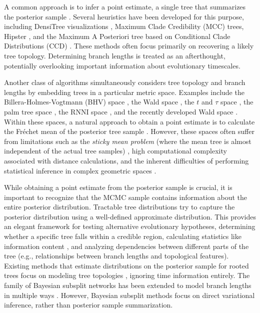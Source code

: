 \documentclass[10pt,letterpaper]{article}
\begin{document}
A common approach is to infer a point estimate, a single  tree that summarizes the posterior sample \cite{treesinforest}. Several heuristics have been developed for this purpose, including DensiTree visualizations \cite{densitree}, Maximum Clade Credibility (MCC) trees, Hipster \cite{hipstr}, and the Maximum A Posteriori tree based on Conditional Clade Distributions (CCD) \cite{ccd,ccdlarget}. These methods often focus primarily on recovering a likely tree topology. Determining branch lengths is treated as an afterthought, potentially overlooking important information about evolutionary timescales.

Another class of algorithms simultaneously considers tree topology and branch lengths by embedding trees in a particular metric space. Examples include the Billera-Holmes-Vogtmann (BHV) space \cite{bhv}, the Wald space \cite{wald}, the $t$ and $\tau$ space \cite{tauspace}, the palm tree space \cite{tropical}, the RNNI space \cite{rnnispace}, and the recently developed Wald space \cite{wald}. Within these spaces, a natural approach to obtain a point estimate is to calculate the Fréchet mean of the posterior tree sample \cite{frechetmeanvar}. However, these spaces often suffer from limitations such as the \emph{sticky mean problem} (where the mean tree is almost independent of the actual tree samples) \cite{sticky}, high computational complexity associated with distance calculations, and the inherent difficulties of performing statistical inference in complex geometric spaces \cite{riemanngaussian}.

While obtaining a point estimate from the posterior sample is crucial, it is important to recognize that the MCMC sample contains information about the entire posterior distribution. Tractable tree distributions \cite{ccd} try to capture the posterior distribution using a well-defined approximate distribution. This provides an elegant framework for testing alternative evolutionary hypotheses, determining whether a specific tree falls within a credible region, calculating statistics like information content \cite{informationcontent}, and analyzing dependencies between different parts of the tree (e.g., relationships between branch lengths and topological features). Existing methods that estimate distributions on the posterior sample for rooted trees focus on modeling tree topologies \cite{ccd,ccdlarget}, ignoring time information entirely. The family of Bayesian subsplit networks \cite{subsplit} has been extended to model branch lengths in multiple ways \cite{subsplitnf,subsplitbranchlengths,artree}. However, Bayesian subsplit methods focus on direct variational inference, rather than posterior sample summarization.
\end{document}
